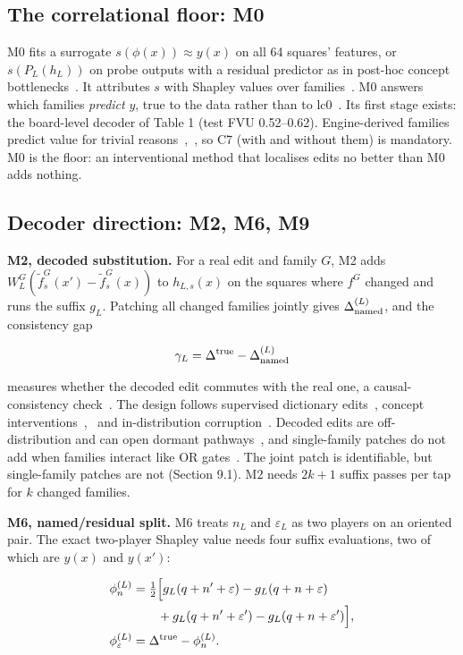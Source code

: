 \documentclass[conference]{IEEEtran}
\begin{document}
\subsection{The correlational floor: M0}\label{sec:7.1}
M0 fits a surrogate $s(\phi(x))\approx y(x)$ on all 64 squares' features, or $s(P_L(h_L))$ on probe outputs with a residual predictor as in post-hoc concept bottlenecks~\cite{yuksekgonul2023}. It attributes $s$ with Shapley values over families~\cite{aas2021}. M0 answers which families \emph{predict} $y$, true to the data rather than to lc0~\cite{chen2020}. Its first stage exists: the board-level decoder of Table 1 (test FVU 0.52--0.62). Engine-derived families predict value for trivial reasons~\cite{kumarA2022},~\cite{parisini2026}, so C7 (with and without them) is mandatory. M0 is the floor: an interventional method that localises edits no better than M0 adds nothing.

\subsection{Decoder direction: M2, M6, M9}\label{sec:7.2}
\textbf{M2, decoded substitution.} For a real edit and family $G$, M2 adds $W^G_L(\tilde f^G_s(x')-\tilde f^G_s(x))$ to $h_{L,s}(x)$ on the squares where $f^G$ changed and runs the suffix $g_L$. Patching all changed families jointly gives $\Delta^{(L)}_{\rm named}$, and the consistency gap

\[
\gamma_L=\Delta^{\rm true}-\Delta^{(L)}_{\rm named}
\]

measures whether the decoded edit commutes with the real one, a causal-consistency check~\cite{rubenstein2017}. The design follows supervised dictionary edits~\cite{makelov2025}, concept interventions~\cite{koh2020},~\cite{shin2023} and in-distribution corruption~\cite{zhang2024}. Decoded edits are off-distribution and can open dormant pathways~\cite{makelov2024}, and single-family patches do not add when families interact like OR gates~\cite{heimersheim2024}. The joint patch is identifiable, but single-family patches are not (Section 9.1). M2 needs $2k+1$ suffix passes per tap for $k$ changed families.

\textbf{M6, named/\allowbreak{}residual split.} M6 treats $n_L$ and $\varepsilon_L$ as two players on an oriented pair. The exact two-player Shapley value needs four suffix evaluations, two of which are $y(x)$ and $y(x')$:

\[
\begin{aligned}\phi^{(L)}_n&=\tfrac12\Big[g_L(q+n'+\varepsilon)-g_L(q+n+\varepsilon)\\
&\qquad+g_L(q+n'+\varepsilon')-g_L(q+n+\varepsilon')\Big],\\
\phi^{(L)}_\varepsilon&=\Delta^{\rm true}-\phi^{(L)}_n.\end{aligned}
\]
\end{document}
